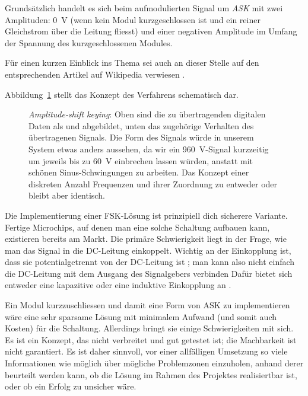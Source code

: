 Grunds\"atzlich handelt es  sich beim aufmodulierten Signal  um \emph{ASK} mit
zwei Amplituden: \SI{0}{\volt}  (wenn kein  Modul kurzgeschlossen ist  und ein
reiner Gleichstrom \"uber  die Leitung fliesst) und  einer negativen Amplitude
im Umfang der Spannung des kurzgeschlossenen Modules.

F\"ur  einen kurzen  Einblick ins  Thema  sei auch  an dieser  Stelle auf  den
entsprechenden Artikel auf Wikipedia verwiesen \cite{ref:ask:wikipedia}.

Abbildung~\ref{fig:ask:concept} stellt das  Konzept des Verfahrens schematisch
dar. 

\begin{figure}[h!tb]
    \centering
    
    \caption{%
        \emph{Amplitude-shift  keying}: Oben   sind  die   zu  \"ubertragenden
        digitalen  Daten  als    und   abgebildet,  unten  das
        zugeh\"orige  Verhalten  des   \"ubertragenen  Signals. Die  Form  des
        Signals w\"urde  in unserem System  etwas anders aussehen, da  wir ein
        \SI{960}{\volt}-Signal  kurzzeitig um  jeweils  bis zu  \SI{60}{\volt}
        einbrechen lassen  w\"urden, anstatt mit  sch\"onen Sinus-Schwingungen
        zu arbeiten. Das  Konzept einer diskreten Anzahl  Frequenzen und ihrer
        Zuordnung zu entweder  oder  bleibt aber identisch.%
    }
    \label{fig:ask:concept}
\end{figure}

Die  Implementierung   einer  FSK-L\"osung  ist  prinzipiell   dich  sicherere
Variante.  Fertige  Microchips, auf denen  man eine solche  Schaltung aufbauen
kann,  existieren  bereits  am  Markt. Die prim\"are  Schwierigkeit  liegt  in
der  Frage,  wie man  das  Signal  in  die DC-Leitung  einkoppelt. Wichtig  an
der  Einkopplung  ist,  dass  sie potentialgetrennt  von  der  DC-Leitung  ist
;  man kann  also  nicht  einfach die  DC-Leitung
mit   dem  Ausgang   des   Signalgebers  verbinden    Daf\"ur bietet sich entweder eine kapazitive oder eine
induktive Einkopplung an .

Ein  Modul kurzzuschliessen  und damit  eine  Form von  ASK zu  implementieren
w\"are  eine sehr  sparsame L\"osung  mit  minimalem Aufwand  (und somit  auch
Kosten) f\"ur die Schaltung. Allerdings  bringt sie einige Schwierigkeiten mit
sich. Es  ist  ein  Konzept,  das  nicht  verbreitet  und  gut  getestet  ist;
die  Machbarkeit  ist  nicht  garantiert. Es ist  daher  sinnvoll,  vor  einer
allf\"alligen Umsetzung so viele Informationen wie m\"oglich \"uber m\"ogliche
Problemzonen einzuholen, anhand  derer beurteilt werden kann,  ob die L\"osung
im Rahmen  des Projektes  realisiertbar ist,  oder ob  ein Erfolg  zu unsicher
w\"are.

